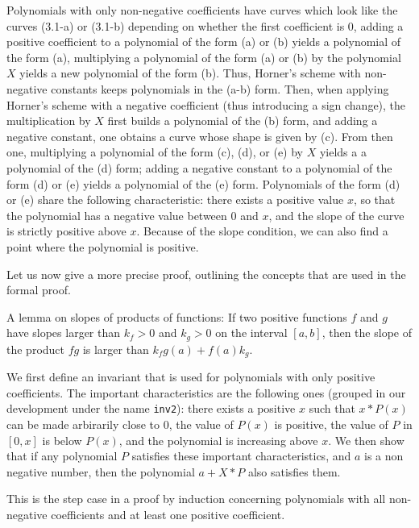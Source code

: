 \documentclass{mscs}
\begin{document}
Polynomials with only non-negative coefficients have curves which look
like the curves (3.1-a) or (3.1-b) depending on whether the first
coefficient is 0, adding a positive coefficient to a polynomial of the
form (a) or (b) yields a polynomial of the form (a), multiplying a
polynomial of the form (a) or (b) by the polynomial \(X\) yields a new
polynomial of the form (b).  Thus, Horner's scheme with non-negative
constants keeps polynomials in the (a-b) form.  Then, when applying
Horner's scheme with a negative coefficient (thus introducing a sign
change), the multiplication by \(X\) first builds a polynomial of the
(b) form, and adding a negative constant, one obtains a curve whose
shape is given by (c).  From then one, multiplying a polynomial of the
form (c), (d), or (e) by \(X\) yields a a polynomial of the (d) form; adding a
negative constant to a polynomial of the form (d) or (e) yields a
polynomial of the (e) form.  Polynomials of the form (d) or (e)
share the following characteristic: there exists a positive value
\(x\), so that the polynomial has a negative value between 0 and
\(x\), and the slope of the curve is strictly positive above
\(x\).  Because of the slope condition, we can also find a point where
the polynomial is positive.

Let us now give a more precise proof, outlining the concepts that are
used in the formal proof.

{\sf A lemma on slopes of products of functions: If two positive functions \(f\)
and \(g\) have slopes larger than \(k_f > 0\) and \(k_g > 0\) on the interval
\([a,b]\), then the slope
of the product \(fg\) is larger than \(k_fg(a) + f(a)k_g\).  }

We first define an invariant that is used for polynomials with only
positive coefficients.  The important characteristics are the
following ones (grouped in our development under the name {\tt inv2}):
there exists a positive \(x\) such that \(x * P(x)\)
can be made arbirarily close to 0, the value of \(P(x)\) is positive,
the value of \(P\) in \([0,x]\) is below \(P(x)\), and the polynomial
is increasing above \(x\).  We then show that if any polynomial \(P\)
satisfies these important characteristics, and \(a\) is a non negative
number, then the polynomial \(a + X * P\) also satisfies them.

This is the step case in a proof by induction concerning polynomials
with all non-negative coefficients and at least one positive coefficient.
\end{document}
